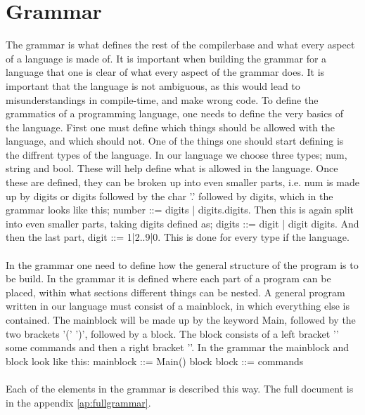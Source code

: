 \section{Grammar}
The grammar is what defines the rest of the compilerbase and what every aspect of a language is made of.
It is important when building the grammar for a language that one is clear of what every aspect of the grammar does. It is important that the language is not ambiguous, as this would lead to misunderstandings in compile-time, and make wrong code.
To define the grammatics of a programming language, one needs to define the very basics of the language. First one must define which things should be allowed with the language, and which should not.
One of the things one should start defining is the diffrent types of the language. In our language we choose three types; num, string and bool. These will help define what is allowed in the language. Once these are defined, they can be broken up into even smaller parts, i.e. num is made up by digits or digits followed by the char '.' followed by digits, which in the grammar looks like this; number ::= digits | digits.digits.
Then this is again split into even smaller parts, taking digits defined as; digits ::= digit | digit digits. And then the last part, digit ::= 1|2..9|0. This is done for every type if the language.\\
\\
In the grammar one need to define how the general structure of the program is to be build. In the grammar it is defined where each part of a program can be placed, within what sections different things can be nested. A general program written in our language must consist of a mainblock, in which everything else is contained. The mainblock will be made up by the keyword Main, followed by the two brackets '(' ')', followed by a block.
The block consists of a left bracket '{' some commands and then a right bracket '}'. In the grammar the mainblock and block look like this: mainblock ::= Main() block
block ::= { commands }\\
\\
Each of the elements in the grammar is described this way. The full document is in the appendix \ref{ap:fullgrammar}.